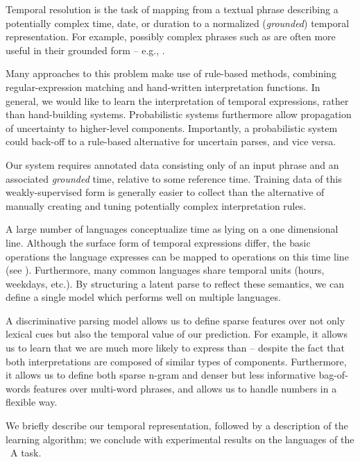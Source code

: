 Temporal resolution is the task of mapping from a textual phrase describing
	a potentially complex time, date, or duration to a normalized
	(\textit{grounded}) temporal representation.
For example, possibly complex phrases such as  are
	often more useful in their grounded form -- e.g., .

Many approaches to this problem make use of rule-based methods, combining
  regular-expression matching and hand-written interpretation functions.
In general, we would like to learn the interpretation of temporal expressions,
	rather than hand-building systems.
Probabilistic systems furthermore allow propagation of uncertainty
	to higher-level components.
Importantly, a probabilistic system could back-off to a rule-based alternative
  for uncertain parses, and vice versa.

Our system requires annotated data consisting only of an input phrase and
  an associated \textit{grounded} time, relative to some reference time.
Training data of this weakly-supervised form
  is generally easier to collect than the alternative of
  manually creating and tuning potentially complex interpretation rules.

A large number of languages conceptualize time as lying on a one dimensional
  line.
Although the surface form of temporal expressions differ, the basic operations
  the language expresses can be mapped to  operations on this
  time line (see ).
Furthermore, many common languages share temporal units (hours, weekdays, etc.).
By structuring a latent parse to reflect these semantics, we can define a single
  model which performs well on multiple languages.

A discriminative parsing model allows us to define sparse features
  over not only lexical cues but also the temporal value of our prediction.
For example, it allows us to learn that we are much more likely to
  express  than  -- despite the fact that
  both interpretations are composed of similar types of components.
Furthermore, it allows us to define both sparse n-gram and denser but less
  informative bag-of-words features over multi-word phrases, and allows us
  to handle numbers in a flexible way.

We briefly describe our temporal representation,
	followed by a description of the learning algorithm; 
	we conclude with experimental results on the languages of the
  \tempeval\ A task.



